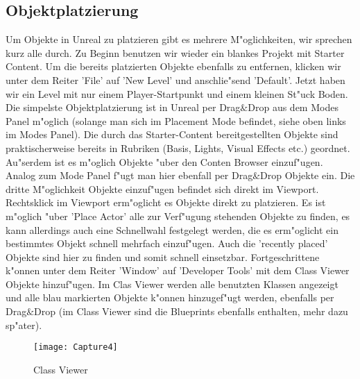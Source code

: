 \documentclass[11pt, titlepage]{article}
\begin{document}
\subsection{Objektplatzierung}

\noindent Um Objekte in Unreal zu platzieren gibt es mehrere M"oglichkeiten, wir sprechen kurz alle durch. Zu Beginn benutzen wir wieder ein blankes Projekt mit Starter Content. Um die bereits platzierten Objekte ebenfalls zu entfernen, klicken wir unter dem Reiter 'File' auf 'New Level' und anschlie"send 'Default'. Jetzt haben wir ein Level mit nur einem Player-Startpunkt und einem kleinen St"uck Boden. \newline
\newline
\noindent Die simpelste Objektplatzierung ist in Unreal per Drag$\&$Drop aus dem Modes Panel m"oglich (solange man sich im Placement Mode befindet, siehe oben links im Modes Panel). Die durch das Starter-Content bereitgestellten Objekte sind praktischerweise bereits in Rubriken (Basis, Lights, Visual Effects etc.) geordnet.  \newline
\newline
\noindent Au"serdem ist es m"oglich Objekte "uber den Conten Browser einzuf"ugen. Analog zum Mode Panel f"ugt man hier ebenfall per Drag$\&$Drop Objekte ein. \newline
\newline
\noindent Die dritte M"oglichkeit Objekte einzuf"ugen befindet sich direkt im Viewport. Rechtsklick im Viewport erm"oglicht es Objekte direkt zu platzieren. Es ist m"oglich "uber 'Place Actor' alle zur Verf"ugung stehenden Objekte zu finden, es kann allerdings auch eine Schnellwahl festgelegt werden, die es erm"oglicht ein bestimmtes Objekt schnell mehrfach einzuf"ugen. Auch die 'recently placed' Objekte sind hier zu finden und somit schnell einsetzbar. \newline
\newline
\noindent Fortgeschrittene k"onnen unter dem Reiter 'Window' auf 'Developer Tools' mit dem Class Viewer Objekte hinzuf"ugen. Im Clas Viewer werden alle benutzten Klassen angezeigt und alle blau markierten Objekte k"onnen hinzugef"ugt werden, ebenfalls per Drag$\&$Drop (im Class Viewer sind die Blueprints ebenfalls enthalten, mehr dazu sp"ater). \newline
\newline

\begin{figure}
\centering
\texttt{[image: Capture4]}
\caption{Class Viewer}
\end{figure}
\end{document}
